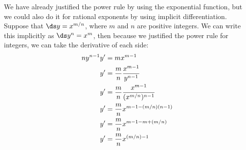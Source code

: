 \begin{example} We have already justified the power rule by
using the exponential function, but we could also do it for rational
exponents by using implicit differentiation.  Suppose that
$\ds y=x^{m/n}$, where $m$ and $n$ are positive integers. We can write
this implicitly as $\ds y^n=x^m$, then because we justified the power rule
for integers, we can take the derivative of each side:
\begin{align*}
ny^{n-1}y' &= mx^{m-1} \\
y'&= {m\over n}{x^{m-1}\over y^{n-1}} \\
y'&= {m\over n}{x^{m-1}\over (x^{m/n})^{n-1}} \\
y'&= {m\over n}x^{m-1-(m/n)(n-1)} \\
y'&= {m\over n}x^{m-1-m+(m/n)} \\
y'&= {m\over n}x^{(m/n)-1} \\
\end{align*}
\end{example}

